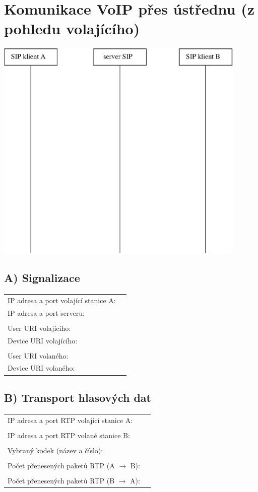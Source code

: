 \section{Komunikace VoIP přes ústřednu (z pohledu volajícího)}
  \begin{center}    
    \includegraphics[width=120mm]{pres-ustrednu.eps}
  \end{center}
  \vspace{1cm}

  \subsection*{A) Signalizace}
  \begin{tabular}{lp{2cm}}
    IP adresa a port volající stanice A: &\\
    IP adresa a port serveru: &\\
    &\\
    User URI volajícího: &\\
    Device URI volajícího: &\\
    &\\
    User URI volaného: &\\
    Device URI volaného: &\\
  \end{tabular}               

  \subsection*{B) Transport hlasových dat}
  \begin{tabular}{lp{2cm}}
    IP adresa a port RTP volající stanice A: &\\
    &\\
    IP adresa a port RTP volané stanice B: &\\
    &\\
    Vybraný kodek (název a číslo): &\\
    &\\
    Počet přenesených paketů RTP (A $\rightarrow$ B): &\\
    &\\
    Počet přenesených paketů RTP (B $\rightarrow$ A): &\\
\end{tabular}               
